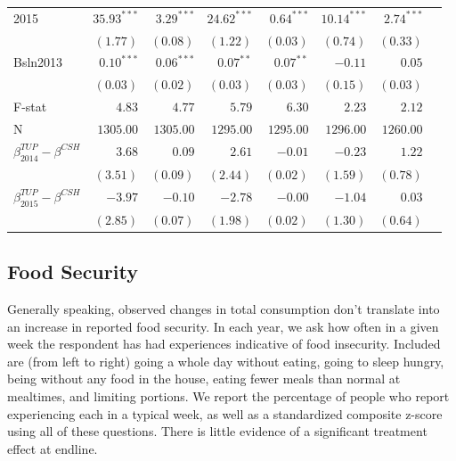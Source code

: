 \documentclass[12pt,article]{article}
\begin{document}
\begin{longtable}{lrrrrrrr}
2015 & \(35.93^{***}\) & \(3.29^{***}\) & \(24.62^{***}\) & \(0.64^{***}\) & \(10.14^{***}\) & \(2.74^{***}\)\\
 & \(( 1.77)\) & \(( 0.08)\) & \(( 1.22)\) & \(( 0.03)\) & \(( 0.74)\) & \(( 0.33)\)\\
Bsln2013 & \(0.10^{***}\) & \(0.06^{***}\) & \(0.07^{**}\) & \(0.07^{**}\) & \(-0.11\) & \(0.05\)\\
 & \(( 0.03)\) & \(( 0.02)\) & \(( 0.03)\) & \(( 0.03)\) & \(( 0.15)\) & \(( 0.03)\)\\
\hline
F-stat & \(4.83\) & \(4.77\) & \(5.79\) & \(6.30\) & \(2.23\) & \(2.12\)\\
N & \(1305.00\) & \(1305.00\) & \(1295.00\) & \(1295.00\) & \(1296.00\) & \(1260.00\)\\
\hline
\(\beta^{TUP}_{2014}-\beta^{CSH}\) & \(3.68\) & \(0.09\) & \(2.61\) & \(-0.01\) & \(-0.23\) & \(1.22\)\\
 & \(( 3.51)\) & \(( 0.09)\) & \(( 2.44)\) & \(( 0.02)\) & \(( 1.59)\) & \(( 0.78)\)\\
\(\beta^{TUP}_{2015}-\beta^{CSH}\) & \(-3.97\) & \(-0.10\) & \(-2.78\) & \(-0.00\) & \(-1.04\) & \(0.03\)\\
 & \(( 2.85)\) & \(( 0.07)\) & \(( 1.98)\) & \(( 0.02)\) & \(( 1.30)\) & \(( 0.64)\)\\
\hline
\end{longtable}

\subsection{Food Security}
\label{sec:orgheadline9}

Generally speaking, observed changes in total consumption don't translate into an
increase in reported food security. In each year, we ask how often in a given week
the respondent has had experiences indicative of food insecurity. Included are (from
left to right) going a whole day without eating, going to sleep hungry, being without
any food in the house, eating fewer meals than normal at mealtimes, and limiting
portions. We report the percentage of people who report experiencing each in a
typical week, as well as a standardized composite z-score using all of these
questions. There is little evidence of a significant treatment effect at endline.
\end{document}
